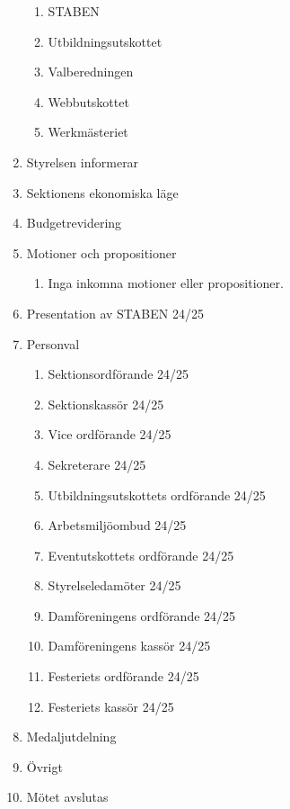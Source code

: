 \documentclass{datateknologsektionen-document}
\begin{document}
\begin{enumerate}[topsep=0pt,itemsep=1ex]
\begin{enumerate}[label*=\arabic*.,leftmargin=3em]
          \item STABEN
          \item Utbildningsutskottet
          \item Valberedningen
          \item Webbutskottet
          \item Werkmästeriet
        \end{enumerate}
  \item Styrelsen informerar
  \item Sektionens ekonomiska läge
  \item Budgetrevidering
  \item Motioner och propositioner
        \begin{enumerate}[label*=\arabic*.,leftmargin=3em]
          \item Inga inkomna motioner eller propositioner.
        \end{enumerate}
  \item Presentation av STABEN 24/25
  \item Personval
        \begin{enumerate}[label*=\arabic*.,leftmargin=3em]
          \item Sektionsordförande 24/25
          \item Sektionskassör 24/25
          \item Vice ordförande 24/25
          \item Sekreterare 24/25
          \item Utbildningsutskottets ordförande 24/25
          \item Arbetsmiljöombud 24/25
          \item Eventutskottets ordförande 24/25
          \item Styrelseledamöter 24/25
          \item Damföreningens ordförande 24/25
          \item Damföreningens kassör 24/25
          \item Festeriets ordförande 24/25
          \item Festeriets kassör 24/25
        \end{enumerate}
  \item Medaljutdelning
  \item Övrigt
  \item Mötet avslutas
\end{enumerate}
\end{document}
